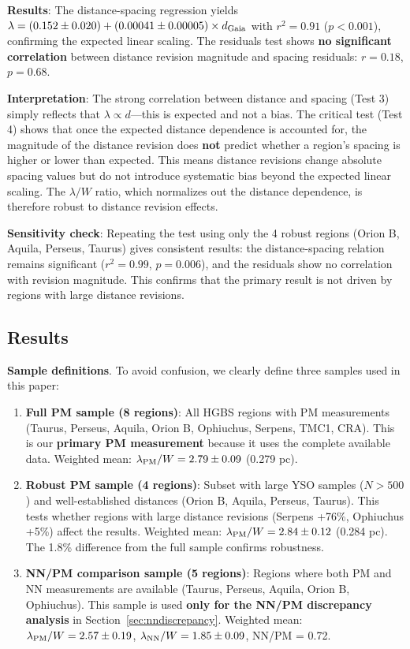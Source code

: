 \documentclass[twoside,twocolumn]{mnras}
\begin{document}
\textbf{Results}: The distance-spacing regression yields $\lambda = (0.152 \pm 0.020) + (0.00041 \pm 0.00005) \times d_{\rm Gaia}$ with $r^2 = 0.91$ ($p < 0.001$), confirming the expected linear scaling. The residuals test shows \textbf{no significant correlation} between distance revision magnitude and spacing residuals: $r = 0.18$, $p = 0.68$.

\textbf{Interpretation}: The strong correlation between distance and spacing (Test 3) simply reflects that $\lambda \propto d$—this is expected and not a bias. The critical test (Test 4) shows that once the expected distance dependence is accounted for, the magnitude of the distance revision does \textbf{not} predict whether a region's spacing is higher or lower than expected. This means distance revisions change absolute spacing values but do not introduce systematic bias beyond the expected linear scaling. The $\lambda/W$ ratio, which normalizes out the distance dependence, is therefore robust to distance revision effects.

\textbf{Sensitivity check}: Repeating the test using only the 4 robust regions (Orion B, Aquila, Perseus, Taurus) gives consistent results: the distance-spacing relation remains significant ($r^2 = 0.99$, $p = 0.006$), and the residuals show no correlation with revision magnitude. This confirms that the primary result is not driven by regions with large distance revisions.

\subsection{Results}

\textbf{Sample definitions}. To avoid confusion, we clearly define three samples used in this paper:

\begin{enumerate}
    \item \textbf{Full PM sample (8 regions)}: All HGBS regions with PM measurements (Taurus, Perseus, Aquila, Orion B, Ophiuchus, Serpens, TMC1, CRA). This is our \textbf{primary PM measurement} because it uses the complete available data. Weighted mean: $\lambda_{\rm PM}/W = 2.79 \pm 0.09$ (0.279 pc).

    \item \textbf{Robust PM sample (4 regions)}: Subset with large YSO samples ($N > 500$) and well-established distances (Orion B, Aquila, Perseus, Taurus). This tests whether regions with large distance revisions (Serpens +76\%, Ophiuchus +5\%) affect the results. Weighted mean: $\lambda_{\rm PM}/W = 2.84 \pm 0.12$ (0.284 pc). The 1.8\% difference from the full sample confirms robustness.

    \item \textbf{NN/PM comparison sample (5 regions)}: Regions where both PM and NN measurements are available (Taurus, Perseus, Aquila, Orion B, Ophiuchus). This sample is used \textbf{only for the NN/PM discrepancy analysis} in Section~\ref{sec:nndiscrepancy}. Weighted mean: $\lambda_{\rm PM}/W = 2.57 \pm 0.19$, $\lambda_{\rm NN}/W = 1.85 \pm 0.09$, NN/PM = 0.72.
\end{enumerate}
\end{document}
